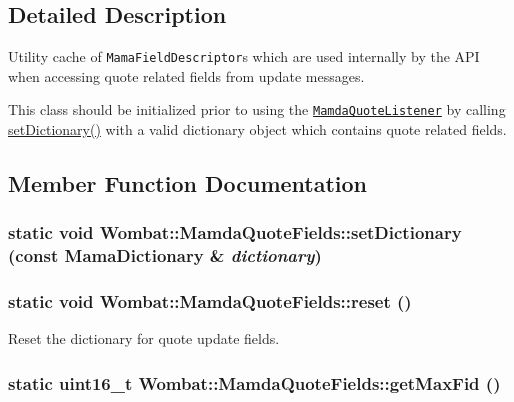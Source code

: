 \subsection{Detailed Description}
Utility cache of {\tt Mama\-Field\-Descriptor}s which are used internally by the API when accessing quote related fields from update messages. 

This class should be initialized prior to using the {\tt \hyperlink{classWombat_1_1MamdaQuoteListener}{Mamda\-Quote\-Listener}} by calling \hyperlink{classWombat_1_1MamdaQuoteFields_b862fe0cd2d5874ef65f7f25703df471}{set\-Dictionary()} with a valid dictionary object which contains quote related fields. 



\subsection{Member Function Documentation}
\hypertarget{classWombat_1_1MamdaQuoteFields_b862fe0cd2d5874ef65f7f25703df471}{
\subsubsection[setDictionary]{\setlength{\rightskip}{0pt plus 5cm}static void Wombat::Mamda\-Quote\-Fields::set\-Dictionary (const Mama\-Dictionary \& {\em dictionary})}}
\label{classWombat_1_1MamdaQuoteFields_b862fe0cd2d5874ef65f7f25703df471}


\hypertarget{classWombat_1_1MamdaQuoteFields_199c60d1ed96f1126f0c4301a52d0528}{
\subsubsection[reset]{\setlength{\rightskip}{0pt plus 5cm}static void Wombat::Mamda\-Quote\-Fields::reset ()}}
\label{classWombat_1_1MamdaQuoteFields_199c60d1ed96f1126f0c4301a52d0528}


Reset the dictionary for quote update fields. 

\hypertarget{classWombat_1_1MamdaQuoteFields_50faf55120faf93f8be717adcd890006}{
\subsubsection[getMaxFid]{\setlength{\rightskip}{0pt plus 5cm}static uint16\_\-t Wombat::Mamda\-Quote\-Fields::get\-Max\-Fid ()}}
\label{classWombat_1_1MamdaQuoteFields_50faf55120faf93f8be717adcd890006}


